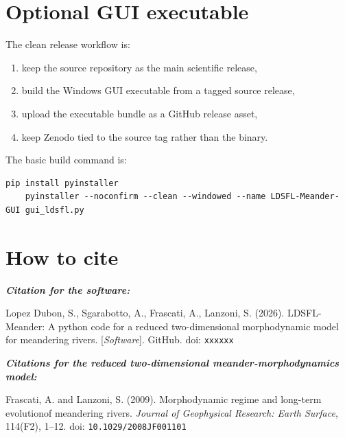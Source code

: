 \documentclass[11pt,a4paper]{article}
\begin{document}
\section{Optional GUI executable}

The clean release workflow is:

\begin{enumerate}[leftmargin=1.4em]
	\item keep the source repository as the main scientific release,
	\item build the Windows GUI executable from a tagged source release,
	\item upload the executable bundle as a GitHub release asset,
	\item keep Zenodo tied to the source tag rather than the binary.
\end{enumerate}

The basic build command is:

\vspace{0.5em}
\begin{lstlisting}[style=codeblock]
	pip install pyinstaller
	pyinstaller --noconfirm --clean --windowed --name LDSFL-Meander-GUI gui_ldsfl.py
\end{lstlisting}


\section{How to cite}

\noindent  \emph{\textbf{Citation for the software:}}

\vspace{0.5em}

\noindent Lopez Dubon, S., Sgarabotto, A., Frascati, A., Lanzoni, S. (2026). LDSFL-Meander: A python code for a reduced two-dimensional morphodynamic model for meandering rivers. [\textit{Software}]. GitHub. doi: \texttt{xxxxxx}

\vspace{1.0 em}

\noindent  \emph{\textbf{Citations for the reduced two-dimensional meander-morphodynamics model:}}

\vspace{0.5em}

\noindent Frascati, A. and Lanzoni, S. (2009). Morphodynamic regime and long-term evolutionof meandering rivers. \textit{Journal of Geophysical Research: Earth Surface}, 114(F2), 1--12. doi: \texttt{10.1029/2008JF001101} 
\end{document}
